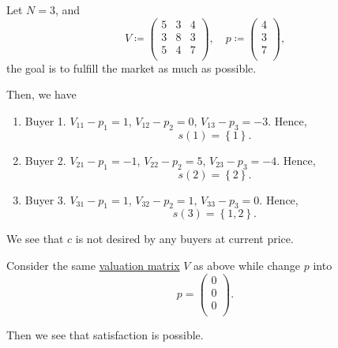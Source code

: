 \begin{eg}
	Let \(N = 3\), and
	\[
		V\coloneqq \begin{pmatrix}
			5 & 3 & 4 \\
			3 & 8 & 3 \\
			5 & 4 & 7 \\
		\end{pmatrix}, \quad p \coloneqq \begin{pmatrix}
			4 \\
			3 \\
			7 \\
		\end{pmatrix},
	\]
	the goal is to fulfill the market as much as possible.
\end{eg}
\begin{explanation}
	Then, we have
	\begin{enumerate}
		\item Buyer 1. \(V_{11}-p_1 = 1\), \(V_{12} - p_2 = 0\), \(V_{13} - p_3 = -3\). Hence,
		      \[
			      s(1) = \left\{1\right\}.
		      \]
		\item Buyer 2. \(V_{21}-p_1 = -1\), \(V_{22} - p_2 = 5\), \(V_{23} - p_3 = -4\). Hence,
		      \[
			      s(2) = \left\{2\right\}.
		      \]
		\item Buyer 3. \(V_{31}-p_1 = 1\), \(V_{32} - p_2 = 1\), \(V_{33} - p_3 = 0\). Hence,
		      \[
			      s(3) = \left\{1, 2\right\}.
		      \]
	\end{enumerate}
	We see that \(c\) is not desired by any buyers at current price.
	\begin{center}
	\end{center}
\end{explanation}

\begin{eg}
	Consider the same \hyperref[def:valuation-matrix]{valuation matrix} \(V\) as above while change \(p\) into
	\[
		p = \begin{pmatrix}
			0 \\
			0 \\
			0 \\
		\end{pmatrix}.
	\]
\end{eg}
\begin{explanation}
	Then we see that satisfaction is possible.
	\begin{center}
	\end{center}
\end{explanation}

